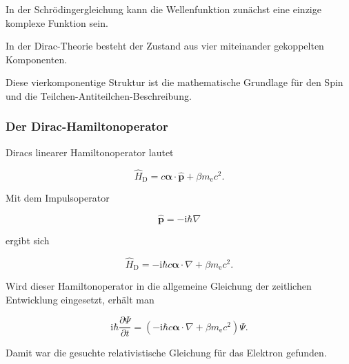 \begin{PhysicsBox}
	\label{box:vom_skalar_zum_spinor}
	
	In der Schrödingergleichung kann die Wellenfunktion zunächst eine
	einzige komplexe Funktion sein.
	
	In der Dirac-Theorie besteht der Zustand aus vier miteinander
	gekoppelten Komponenten.
	
	Diese vierkomponentige Struktur ist die mathematische Grundlage für den
	Spin und die Teilchen-Antiteilchen-Beschreibung.
\end{PhysicsBox}

\subsubsection*{Der Dirac-Hamiltonoperator}

Diracs linearer Hamiltonoperator%
 lautet

\begin{equation}
	\hat{H}_{\mathrm D}
	=
	c\boldsymbol{\alpha}\cdot\hat{\mathbf{p}}
	+
	\beta m_{\mathrm e}c^2.
	\label{eq:dirac_hamiltonoperator_weg}
\end{equation}

Mit dem Impulsoperator

\begin{equation}
	\hat{\mathbf{p}}
	=
	-\mathrm{i}\hbar\nabla
\end{equation}

ergibt sich

\begin{equation}
	\hat{H}_{\mathrm D}
	=
	-\mathrm{i}\hbar c
	\boldsymbol{\alpha}\cdot\nabla
	+
	\beta m_{\mathrm e}c^2.
\end{equation}

Wird dieser Hamiltonoperator in die allgemeine Gleichung der
zeitlichen Entwicklung eingesetzt, erhält man

\begin{equation}
	\mathrm{i}\hbar
	\frac{\partial\Psi}{\partial t}
	=
	\left(
	-\mathrm{i}\hbar c
	\boldsymbol{\alpha}\cdot\nabla
	+
	\beta m_{\mathrm e}c^2
	\right)
	\Psi.
	\label{eq:diracgleichung_am_ende_des_weges}
\end{equation}

Damit war die gesuchte relativistische Gleichung für das Elektron
gefunden.

